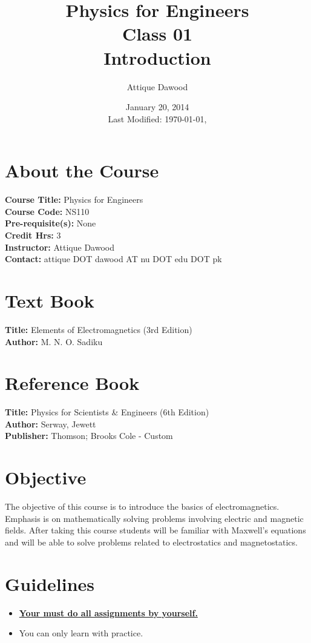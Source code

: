 \documentclass[12pt,a4paper]{article}
\title{\vspace{-2cm}Physics for Engineers\\Class 01\\Introduction}
\author{Attique Dawood}
\date{January 20, 2014\\[0.2cm] Last Modified: \today, \currenttime}
\begin{document}
\maketitle
\section{About the Course}
\textbf{Course Title:} Physics for Engineers\\
\textbf{Course Code:} NS110\\
\textbf{Pre-requisite(s):} None\\
\textbf{Credit Hrs:} 3\\
\textbf{Instructor:} Attique Dawood\\
\textbf{Contact:} attique DOT dawood AT nu DOT edu DOT pk\\
\section{Text Book}
\textbf{Title:} Elements of Electromagnetics (3rd Edition)\\
\textbf{Author:} M. N. O. Sadiku\\
\section{Reference Book}
\textbf{Title:} Physics for Scientists \& Engineers  (6th Edition)\\
\textbf{Author:} Serway, Jewett\\
\textbf{Publisher:} Thomson; Brooks Cole - Custom\\
\section{Objective}
The objective of this course is to introduce the basics of electromagnetics. Emphasis is on mathematically solving problems involving electric and magnetic fields. After taking this course students will be familiar with Maxwell’s equations and will be able to solve problems related to electrostatics and magnetostatics.
\section{Guidelines}
\begin{itemize}
\item \textbf{\underline{Your must do all assignments by yourself.}}
\item You can only learn with practice.
\end{itemize}
\end{document}
